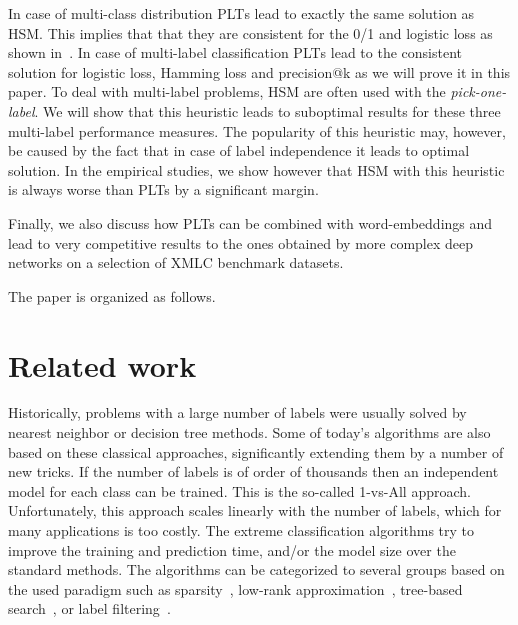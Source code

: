 \documentclass{article}
\newcommand{\Algo}[1]{\textsc{#1}}
\newcommand{\sectionBefore}{-0pt}
\newcommand{\sectionAfter}{-0pt}
\begin{document}
In case of multi-class distribution \Algo{PLT}s lead to exactly the same solution as HSM. This implies that that they are consistent for the 0/1 and logistic loss as shown in~\citep{Dembczynski_et_al_2016}. In case of multi-label classification \Algo{PLT}s  lead to the consistent solution for logistic loss, Hamming loss and precision@k as we will prove it in this paper. To deal with multi-label problems, HSM are often used with the \emph{pick-one-label}. We will show that this heuristic leads to suboptimal results for these three multi-label performance measures. The popularity of this heuristic may, however, be caused by the fact that in case of label independence it leads to optimal solution. In the empirical studies, we show however that HSM with this heuristic is always worse than PLTs by a significant margin. 

Finally, we also discuss how PLTs can be combined with word-embeddings and lead to very competitive results to the ones obtained by more complex deep networks on a selection of XMLC benchmark datasets. 

The paper is organized  as follows.


\vspace{\sectionBefore}
\section{Related work}
\vspace{\sectionAfter}

Historically, problems with a large number of labels were usually solved by nearest neighbor or decision tree methods. Some of today's algorithms are also based on these classical approaches, significantly extending them by a number of new tricks. If the number of labels is of order of thousands then an independent model for each class can be trained. This is the so-called {1-vs-All} approach. Unfortunately, this approach scales linearly with the number of labels, which for many applications is too costly. The extreme classification algorithms try to improve the training and prediction time, and/or the model size over the standard methods. The algorithms can be categorized to several groups based on the used paradigm such as sparsity~\citep{Yen_et_al_2017,Babbar_Scholkopf_2017}, low-rank approximation~\cite{Mineiro_Karampatziakis_2015,Yu_et_al_2014,Bhatia_et_al_2015}, tree-based search~\citep{Prabhu_Varma_2014,Choromanska_Langford_2015,Jasinska_et_al_2016}, or label filtering~\citep{Cisse_et_al_2013,Vijayanarasimhan_et_al_2014,Shrivastava_Li_2015,Niculescu-Mizil_Abbasnejad_2017}.
\end{document}
